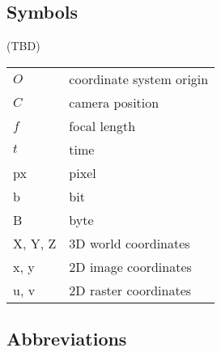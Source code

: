 
\subsection*{Symbols}

(TBD)

\begin{tabular}{ll}
$O$			& coordinate system origin\\
$C$			& camera position\\
$f$			& focal length\\
$t$			& time\\
px			& pixel\\
b			& bit\\
B			& byte\\


X, Y, Z		& 3D world coordinates\\
x, y		& 2D image coordinates\\
u, v		& 2D raster coordinates\\
\end{tabular}
%
%

\subsection*{Abbreviations}

